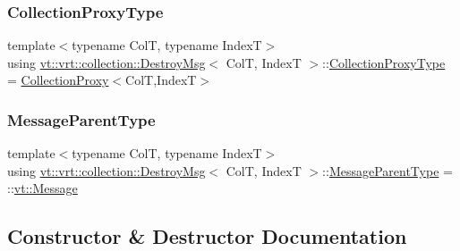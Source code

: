 \subsubsection{\texorpdfstring{Collection\+Proxy\+Type}{CollectionProxyType}}
{\footnotesize\ttfamily template$<$typename ColT, typename IndexT$>$ \\
using \hyperlink{structvt_1_1vrt_1_1collection_1_1_destroy_msg}{vt\+::vrt\+::collection\+::\+Destroy\+Msg}$<$ ColT, IndexT $>$\+::\hyperlink{structvt_1_1vrt_1_1collection_1_1_destroy_msg_a5bf089cacadf94e55e9ae797c4cd0462}{Collection\+Proxy\+Type} =  \hyperlink{structvt_1_1vrt_1_1collection_1_1_collection_proxy}{Collection\+Proxy}$<$ColT,IndexT$>$}

\mbox{\label{structvt_1_1vrt_1_1collection_1_1_destroy_msg_a18f035465f85a59ba6aea71a3829b500}} 
\subsubsection{\texorpdfstring{Message\+Parent\+Type}{MessageParentType}}
{\footnotesize\ttfamily template$<$typename ColT, typename IndexT$>$ \\
using \hyperlink{structvt_1_1vrt_1_1collection_1_1_destroy_msg}{vt\+::vrt\+::collection\+::\+Destroy\+Msg}$<$ ColT, IndexT $>$\+::\hyperlink{structvt_1_1messaging_1_1_active_msg_ac2e6d93267991027ce78c968b17064c7}{Message\+Parent\+Type} =  \+::\hyperlink{namespacevt_a3a3ddfef40b4c90915fa43cdd5f129ea}{vt\+::\+Message}}



\subsection{Constructor \& Destructor Documentation}
\mbox{\label{structvt_1_1vrt_1_1collection_1_1_destroy_msg_a3c7d44bb51d25e0853cb56c4403c2666}} 
